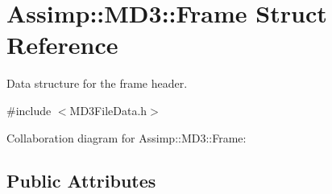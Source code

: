 \hypertarget{struct_assimp_1_1_m_d3_1_1_frame}{\section{Assimp\+:\+:M\+D3\+:\+:Frame Struct Reference}
\label{struct_assimp_1_1_m_d3_1_1_frame}
}


Data structure for the frame header.  




{\ttfamily \#include $<$M\+D3\+File\+Data.\+h$>$}



Collaboration diagram for Assimp\+:\+:M\+D3\+:\+:Frame\+:
\subsection*{Public Attributes}
